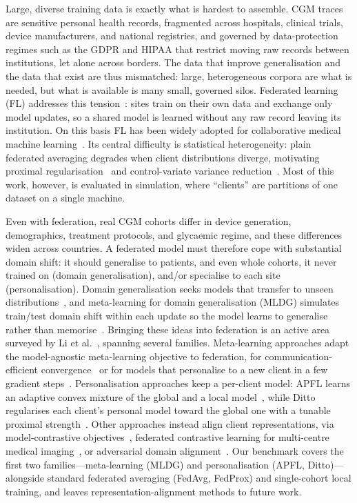 \documentclass[10pt,letterpaper]{article}
\begin{document}
Large, diverse training data is exactly what is hardest to assemble. CGM traces
are sensitive personal health records, fragmented across hospitals, clinical
trials, device manufacturers, and national registries, and governed by
data-protection regimes such as the GDPR and HIPAA that restrict moving raw
records between institutions, let alone across borders. The data that improve
generalisation and the data that exist are thus mismatched: large, heterogeneous
corpora are what is needed, but what is available is many small, governed silos.
Federated learning (FL) addresses this tension~\cite{mcmahan2017fedavg}: sites
train on their own data and exchange only model updates, so a shared model is
learned without any raw record leaving its institution. On this basis FL has been
widely adopted for collaborative medical machine
learning~\cite{rieke2020future,sheller2020federated,kaissis2020secure}. Its
central difficulty is statistical heterogeneity: plain federated averaging
degrades when client distributions diverge, motivating proximal
regularisation~\cite{li2020fedprox} and control-variate variance
reduction~\cite{karimireddy2020scaffold}. Most of this work, however, is evaluated
in simulation, where ``clients'' are partitions of one dataset on a single
machine.

Even with federation, real CGM cohorts differ in device generation, demographics,
treatment protocols, and glycaemic regime, and these differences widen across
countries. A federated model must therefore cope with substantial domain shift: it
should generalise to patients, and even whole cohorts, it never trained on (domain
generalisation), and/or specialise to each site (personalisation). Domain
generalisation seeks models that transfer to unseen
distributions~\cite{zhou2022dgsurvey}, and meta-learning for domain generalisation
(MLDG) simulates train/test domain shift within each update so the model learns to
generalise rather than memorise~\cite{li2018mldg}. Bringing these ideas into
federation is an active area surveyed by Li et al.~\cite{li2025fedDGsurvey},
spanning several families. Meta-learning approaches adapt the model-agnostic
meta-learning objective to federation, for communication-efficient
convergence~\cite{chen2018fedmeta} or for models that personalise to a new client
in a few gradient steps~\cite{fallah2020perfedavg}. Personalisation approaches keep
a per-client model: APFL learns an adaptive convex mixture of the global and a
local model~\cite{deng2020apfl}, while Ditto regularises each client's personal
model toward the global one with a tunable proximal strength~\cite{li2021ditto}.
Other approaches instead align client representations, via model-contrastive
objectives~\cite{li2021moon}, federated contrastive learning for multi-centre
medical imaging~\cite{fedcl2023}, or adversarial domain
alignment~\cite{flda2023,fedadv2022}. Our benchmark covers the first two
families---meta-learning (MLDG) and personalisation (APFL, Ditto)---alongside
standard federated averaging (FedAvg, FedProx) and single-cohort local training,
and leaves representation-alignment methods to future work.
\end{document}
